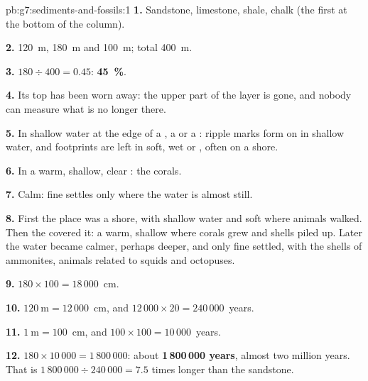 \begin{solution}{pb:g7:sediments-and-fossils:1}
\textbf{1.} Sandstone, limestone, shale, chalk (the first at the bottom
of the column).

\textbf{2.} \qty{120}{m}, \qty{180}{m} and \qty{100}{m}; total
\qty{400}{m}.

\textbf{3.} $180 \div 400 = 0.45$: \textbf{45~\%}.

\textbf{4.} Its top has been worn away: the upper part of the layer is
gone, and nobody can measure what is no longer there.

\textbf{5.} In shallow water at the edge of a , a  or a :
ripple marks form on  in shallow water, and footprints are left in
soft, wet  or , often on a shore.

\textbf{6.} In a warm, shallow, clear : the corals.

\textbf{7.} Calm: fine  settles only where the water is almost still.

\textbf{8.} First the place was a shore, with shallow water and soft 
where animals walked. Then the  covered it: a warm, shallow  where
corals grew and shells piled up. Later the water became calmer, perhaps
deeper, and only fine  settled, with the shells of ammonites, animals
related to squids and octopuses.

\textbf{9.} $180 \times 100 = 18\,000$~cm.

\textbf{10.} $120~\text{m} = 12\,000$~cm, and $12\,000 \times 20 =
240\,000$~years.

\textbf{11.} $1~\text{m} = 100$~cm, and $100 \times 100 = 10\,000$~years.

\textbf{12.} $180 \times 10\,000 = 1\,800\,000$: about
\textbf{1\,800\,000 years}, almost two million years. That is
$1\,800\,000 \div 240\,000 = 7.5$ times longer than the sandstone.
\end{solution}
